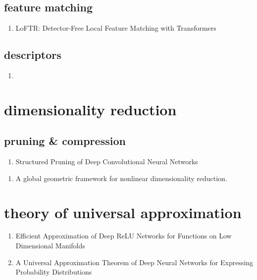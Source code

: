 \documentclass[acmlarge]{acmart}
\begin{document}
	\subsection{feature matching}
	\begin{enumerate}
		\item LoFTR: Detector-Free Local Feature Matching with Transformers \cite{Sun2021LoFTRDL} 

	\end{enumerate}
	\subsection{descriptors}
	\begin{enumerate}
		\item
	\end{enumerate}
\begin{enumerate}
\end{enumerate}
\section{dimensionality reduction}
	\subsection{pruning & compression}
	\begin{enumerate}
		\item Structured Pruning of Deep Convolutional Neural Networks \cite{Anwar2017StructuredPO} 

	\end{enumerate}
\begin{enumerate}
	\item A global geometric framework for nonlinear dimensionality reduction. \cite{Tenenbaum2000AGG} 

\end{enumerate}
\section{theory of universal approximation}
\begin{enumerate}
	\item Efficient Approximation of Deep ReLU Networks for Functions on Low Dimensional Manifolds \cite{Chen2019EfficientAO} 

	\item A Universal Approximation Theorem of Deep Neural Networks for Expressing Probability Distributions \cite{Lu2020AUA} 

\end{enumerate}
\end{document}

